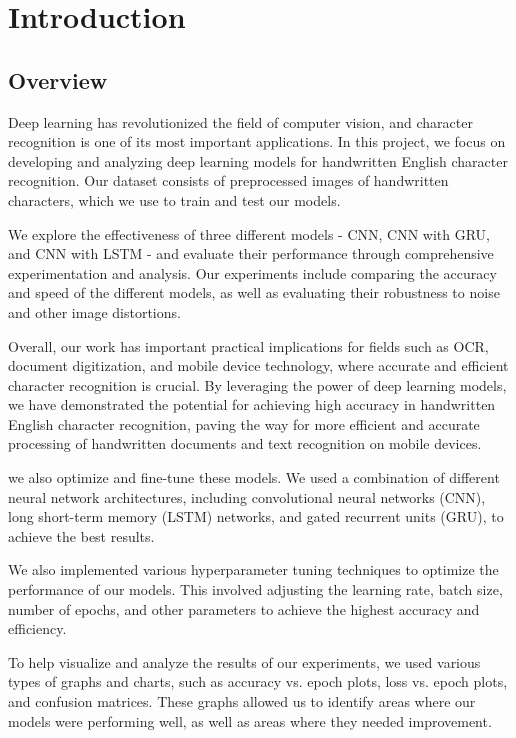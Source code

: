 \chapter{Introduction}\label{chap1}

\section{Overview}
Deep learning has revolutionized the field of computer vision, and character recognition is one of its most important applications. In this project, we focus on developing and analyzing deep learning models for handwritten English character recognition. Our dataset consists of preprocessed images of handwritten characters, which we use to train and test our models.

We explore the effectiveness of three different models - CNN, CNN with GRU, and CNN with LSTM - and evaluate their performance through comprehensive experimentation and analysis. Our experiments include comparing the accuracy and speed of the different models, as well as evaluating their robustness to noise and other image distortions.

Overall, our work has important practical implications for fields such as OCR, document digitization, and mobile device technology, where accurate and efficient character recognition is crucial. By leveraging the power of deep learning models, we have demonstrated the potential for achieving high accuracy in handwritten English character recognition, paving the way for more efficient and accurate processing of handwritten documents and text recognition on mobile devices.

we also optimize and fine-tune these models. We used a combination of different neural network architectures, including convolutional neural networks (CNN), long short-term memory (LSTM) networks, and gated recurrent units (GRU), to achieve the best results.

We also implemented various hyperparameter tuning techniques to optimize the performance of our models. This involved adjusting the learning rate, batch size, number of epochs, and other parameters to achieve the highest accuracy and efficiency.

To help visualize and analyze the results of our experiments, we used various types of graphs and charts, such as accuracy vs. epoch plots, loss vs. epoch plots, and confusion matrices. These graphs allowed us to identify areas where our models were performing well, as well as areas where they needed improvement.

